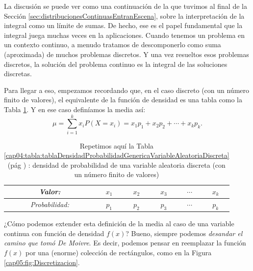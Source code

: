 La discusión se puede ver como una continuación de la que tuvimos al final de la Sección \ref{sec:distribucionesContinuasEntranEscena}, sobre la interpretación de la integral como un límite de sumas. De hecho, ese es el papel fundamental que la integral juega muchas veces en la aplicaciones. Cuando tenemos un problema en un contexto continuo, a menudo tratamos de descomponerlo como suma (aproximada) de muchos problemas discretos. Y una vez resueltos esos problemas discretos, la solución del problema continuo es la integral de las soluciones discretas.

Para llegar a eso, empezamos recordando que, en el caso discreto (con un número finito de valores), el equivalente de la función de densidad es una tabla como la Tabla
\ref{cap05:tabla:tablaDensidadProbabilidadGenericaVariableAleatoriaDiscreta}. Y en ese caso definíamos la media así:
    \[\mu=\sum_{i=1}^{k}x_iP(X=x_i)=x_1 p_1+x_2 p_2+\cdots+x_k p_k.\]
    \begin{table}[h]
    \begin{center}
    \begin{tabular}[t]{|c|c|c|c|c|c|}
    \hline
    \rule{0cm}{0.5cm}{\em Valor:}&$x_1$&$x_2$&$x_3$&$\cdots$&$x_k$\\
    \hline
    \rule{0cm}{0.7cm}{\em Probabilidad:}&$p_1$&$p_2$&$p_3$&$\cdots$&$p_k$\\
    \hline
    \end{tabular}
    \end{center}
    \caption{Repetimos aquí la Tabla \ref{cap04:tabla:tablaDensidadProbabilidadGenericaVariableAleatoriaDiscreta} (pág \pageref{cap04:tabla:tablaDensidadProbabilidadGenericaVariableAleatoriaDiscreta})
    : densidad de probabilidad de una variable aleatoria discreta (con un número finito de valores)}\label{cap05:tabla:tablaDensidadProbabilidadGenericaVariableAleatoriaDiscreta}
    \end{table}

¿Cómo podemos extender esta definición de la media al caso de una variable continua con función de densidad $f(x)$? Bueno, siempre podemos {\em desandar el camino que tomó De Moivre}. Es decir, podemos pensar en reemplazar la función $f(x)$ por una (enorme) colección de rectángulos, como en la Figura \ref{cap05:fig:Discretizacion}.

